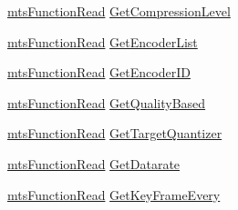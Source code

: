 \begin{DoxyCompactItemize}
\item 
\hyperlink{classmts_function_read}{mts\-Function\-Read} \hyperlink{class_i_req_video_encoder_a9abdfd9861323efb8b6e8a2980f4444d}{Get\-Compression\-Level}
\item 
\hyperlink{classmts_function_read}{mts\-Function\-Read} \hyperlink{class_i_req_video_encoder_a52e47634dd016f429e15b39a06821c23}{Get\-Encoder\-List}
\item 
\hyperlink{classmts_function_read}{mts\-Function\-Read} \hyperlink{class_i_req_video_encoder_a195d69c21a6d22e9141c68e855067689}{Get\-Encoder\-I\-D}
\item 
\hyperlink{classmts_function_read}{mts\-Function\-Read} \hyperlink{class_i_req_video_encoder_ac6760f91f98792c688a9623902fa1b41}{Get\-Quality\-Based}
\item 
\hyperlink{classmts_function_read}{mts\-Function\-Read} \hyperlink{class_i_req_video_encoder_abb57f537b932e1fe684f18be2490d412}{Get\-Target\-Quantizer}
\item 
\hyperlink{classmts_function_read}{mts\-Function\-Read} \hyperlink{class_i_req_video_encoder_ae3f16e8a20fc6dacee2e19e6191e6b32}{Get\-Datarate}
\item 
\hyperlink{classmts_function_read}{mts\-Function\-Read} \hyperlink{class_i_req_video_encoder_a1a7ab3ceb6be4f47ce9ad22fd9743c3c}{Get\-Key\-Frame\-Every}
\end{DoxyCompactItemize}


